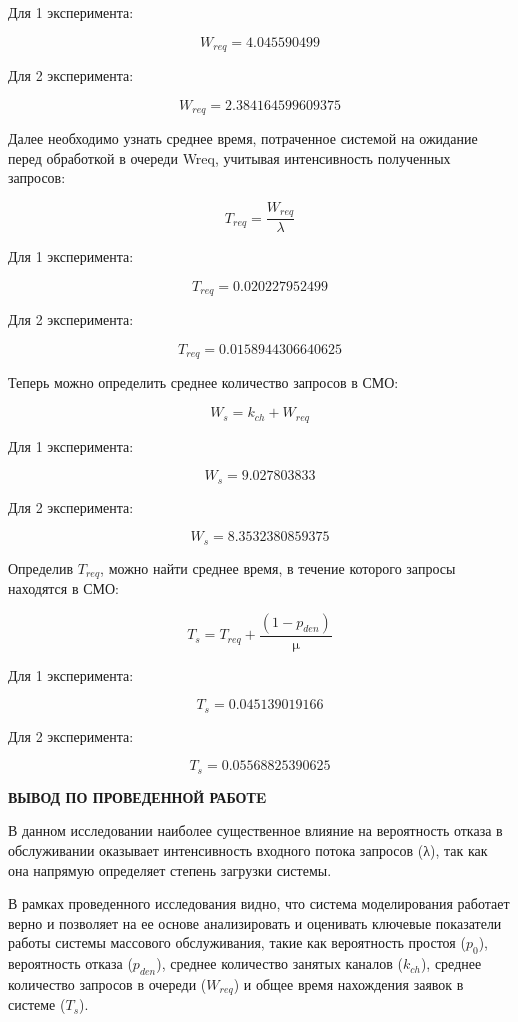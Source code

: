 Для 1 эксперимента:

$$W_{req} = 4.045590499$$

Для 2 эксперимента:

$$W_{req} = 2.384164599609375$$

Далее необходимо узнать среднее время, потраченное системой на
ожидание перед обработкой в очереди Wreq, учитывая интенсивность
полученных запросов:

$$T_{req} = \frac{W_{req}}{\lambda}$$

Для 1 эксперимента:

$$T_{req} = 0.020227952499$$

Для 2 эксперимента:

$$T_{req} = 0.0158944306640625$$

Теперь можно определить среднее количество запросов в СМО:

$$W_s = k_{ch} + W_{req}$$

Для 1 эксперимента:

$$W_s = 9.027803833$$

Для 2 эксперимента:

$$W_s = 8.3532380859375$$

Определив $T_{req}$, можно найти среднее время, в течение которого запросы
находятся в СМО:

$$T_s = T_{req} + \frac{(1-p_{den})}{\upmu}$$

Для 1 эксперимента:

$$T_s = 0.045139019166$$

Для 2 эксперимента:

$$T_s = 0.05568825390625$$

\pagebreak

\begin{center}
    \textbf{ВЫВОД ПО ПРОВЕДЕННОЙ РАБОТE}
\end{center}

В данном исследовании наиболее существенное влияние на вероятность отказа в обслуживании оказывает интенсивность входного потока запросов (λ), так как она напрямую определяет степень загрузки системы.

В рамках проведенного исследования видно, что
система моделирования работает верно и позволяет на ее основе анализировать и оценивать ключевые показатели работы системы массового обслуживания, такие как вероятность простоя ($p_0$), вероятность отказа ($p_{den}$), среднее количество занятых каналов ($k_{ch}$), среднее количество запросов в очереди ($W_{req}$) и общее время нахождения заявок в системе ($T_s$).


